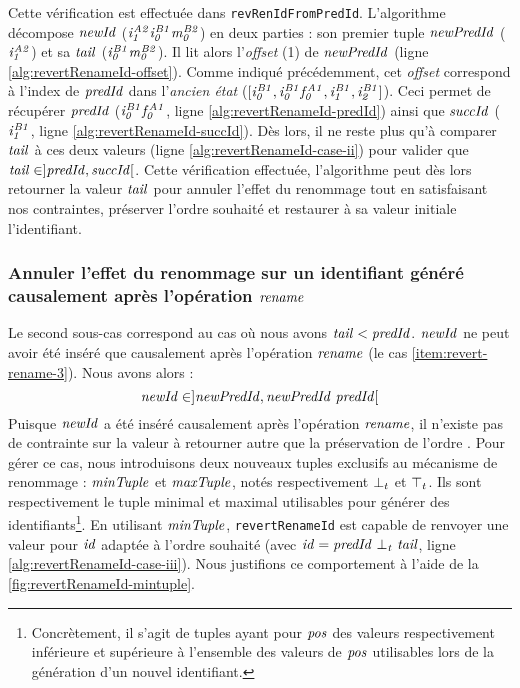 Cette vérification est effectuée dans \texttt{revRenIdFromPredId}.
L'algorithme décompose $\mathit{newId}$ (\eg $\mathit{i}^{\mathit{A2}}_{\mathit{1}}\mathit{i}^{\mathit{B1}}_{\mathit{0}}\mathit{m}^{\mathit{B2}}_{\mathit{0}}$) en deux parties : son premier tuple $\mathit{newPredId}$ ($\mathit{i}^{\mathit{A2}}_{\mathit{1}}$) et sa $\mathit{tail}$ ($\mathit{i}^{\mathit{B1}}_{\mathit{0}}\mathit{m}^{\mathit{B2}}_{\mathit{0}}$).
Il lit alors l'\emph{offset} (1) de $\mathit{newPredId}$ (ligne \ref{alg:revertRenameId-offset}).
Comme indiqué précédemment, cet \emph{offset} correspond à l'index de $\mathit{predId}$ dans l'\emph{ancien état} ($[\mathit{i}^{\mathit{B1}}_{\mathit{0}},\mathit{i}^{\mathit{B1}}_{\mathit{0}}\mathit{f}^{\mathit{A1}}_{\mathit{0}},\mathit{i}^{\mathit{B1}}_{\mathit{1}},\mathit{i}^{\mathit{B1}}_{\mathit{2}}]$).
Ceci permet de récupérer $\mathit{predId}$ ($\mathit{i}^{\mathit{B1}}_{\mathit{0}}\mathit{f}^{\mathit{A1}}_{\mathit{0}}$, ligne \ref{alg:revertRenameId-predId}) ainsi que $\mathit{succId}$ ($\mathit{i}^{\mathit{B1}}_{\mathit{1}}$, ligne \ref{alg:revertRenameId-succId}).
Dès lors, il ne reste plus qu'à comparer $\mathit{tail}$ à ces deux valeurs (ligne \ref{alg:revertRenameId-case-ii}) pour valider que $\mathit{tail} \in ]\mathit{predId},\mathit{succId}[$.
Cette vérification effectuée, l'algorithme peut dès lors retourner la valeur $\mathit{tail}$ pour annuler l'effet du renommage tout en satisfaisant nos contraintes, \ie préserver l'ordre souhaité et restaurer à sa valeur initiale l'identifiant.

\subsubsection{Annuler l'effet du renommage sur un identifiant généré causalement après l'opération $\mathit{rename}$}

Le second sous-cas correspond au cas où nous avons $\mathit{tail} < \mathit{predId}$.
$\mathit{newId}$ ne peut avoir été inséré que causalement après l'opération $\mathit{rename}$ (\ie le cas \ref{item:revert-rename-3}).
Nous avons alors :
\[\mathit{newId} \in ]\mathit{newPredId}, \mathit{newPredId~predId}[\]
Puisque $\mathit{newId}$ a été inséré causalement après l'opération $\mathit{rename}$, il n'existe pas de contrainte sur la valeur à retourner autre que la préservation de l'ordre .
Pour gérer ce cas, nous introduisons deux nouveaux tuples exclusifs au mécanisme de renommage : $\mathit{minTuple}$ et $\mathit{maxTuple}$, notés respectivement $\bot_t$ et $\top_t$.
Ils sont respectivement le tuple minimal et maximal utilisables pour générer des identifiants\footnote{Concrètement, il s'agit de tuples ayant pour $\mathit{pos}$ des valeurs respectivement inférieure et supérieure à l'ensemble des valeurs de $\mathit{pos}$ utilisables lors de la génération d'un nouvel identifiant.}.
En utilisant $\mathit{minTuple}$, \texttt{revertRenameId} est capable de renvoyer une valeur pour $\mathit{id}$ adaptée à l'ordre souhaité (avec $\mathit{id} = \mathit{predId~\bot_t~tail}$, ligne \ref{alg:revertRenameId-case-iii}).
Nous justifions ce comportement à l'aide de la \autoref{fig:revertRenameId-mintuple}.

